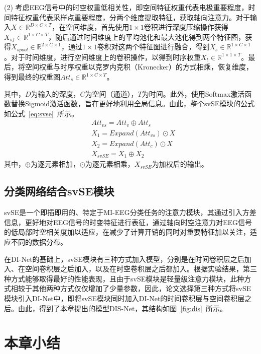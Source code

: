 (2) 考虑EEG信号中的时空权重低相关性，即空间特征权重代表电极重要程度，时间特征权重代表采样点重要程度，分两个维度提取特征，获取轴向注意力。对于输入\(X \in \mathbb{R}^{D \times C \times T}\)，在空间维度，首先使用\(1\times1\)卷积进行深度压缩操作获得\(X_{sf} \in \mathbb{R}^{1 \times C \times T}\)，随后通过时间维度上的平均池化和最大池化得到两个特征图，获得\(X_{spool} \in \mathbb{R}^{2 \times C \times 1}\)，通过\(1\times1\)卷积对这两个特征图进行融合，得到\(X_s \in \mathbb{R}^{1 \times C \times 1}\)。对于时间维度，进行空间维度上的卷积操作，以得到时序权重\(X_t \in \mathbb{R}^{1 \times 1 \times T}\)。最后，将空间权重与时序权重以克罗内克积（Kronecker）的方式相乘，恢复维度，得到最终的权重图\(Att_s \in \mathbb{R}^{1 \times C \times T}\)。

其中，\(D\)为输入的深度，\(C\)为空间（通道），\(T\)为时间。此外，使用Softmax激活函数替换Sigmoid激活函数，旨在更好地利用全局信息。由此，整个svSE模块的公式如公式~\ref{eq:svse}~所示。
\begin{equation}\label{eq:svse}
    \begin{aligned}
        &Att_{vs}=Att_v \oplus Att_s \\
        &X_1=Expand(Att_{vs}) \odot X \\
        &X_2=Expand(Att_c) \odot X \\
        &X_{svSE}=X_1 \oplus X_2
    \end{aligned}
\end{equation}
其中，\(\oplus\)为逐元素相加，\(\odot\)为逐元素相乘，\(X_{svSE}\)为加权后的输出。

\subsection{分类网络结合svSE模块}

svSE是一个即插即用的、特定于MI-EEG分类任务的注意力模块，其通过引入方差信息，更好地对EEG信号的时变特征进行表征，通过轴向时空注意力对EEG信号的低局部时空相关度加以适应，在减少了计算开销的同时对重要特征加以关注，适应不同的数据分布。

在DI-Net的基础上，svSE模块有三种方式加入模型，分别是在时间卷积层之后加入、在空间卷积层之后加入，以及在时空卷积层之后都加入。根据实验结果，第三种方式能够取得最好的性能表现，且由于svSE模块是轻量级注意力模块，此种方式相较于其他两种方式仅仅增加了少量参数，因此，论文选择第三种方式将svSE模块引入DI-Net中，即将svSE模块同时加入DI-Net的时间卷积层与空间卷积层之后。由此，得到了本章提出的模型DIS-Net，其结构如图~\ref{fig:dis}~所示。

\section{本章小结}

